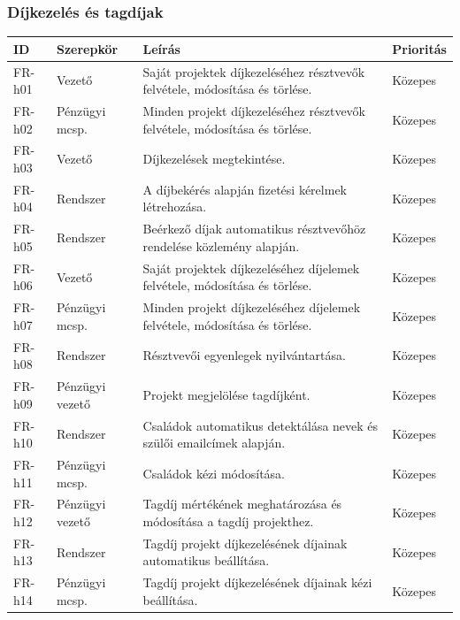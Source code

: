 \documentclass[a4paper,12pt]{article}
\begin{document}
\subsubsection{Díjkezelés és tagdíjak}
\begin{table}[H]
  \centering
  \begin{tabular}{llL{8.5cm}l}
  \toprule
  ID & Szerepkör & Leírás & Prioritás \\
  \midrule
  FR-h01 & Vezető           & Saját projektek díjkezeléséhez résztvevők felvétele, módosítása és törlése.               & Közepes\\
  FR-h02 & Pénzügyi mcsp.   & Minden projekt díjkezeléséhez résztvevők felvétele, módosítása és törlése.                & Közepes\\
  FR-h03 & Vezető           & Díjkezelések megtekintése.                                                                & Közepes\\
  FR-h04 & Rendszer         & A díjbekérés alapján fizetési kérelmek létrehozása.                                       & Közepes\\
  FR-h05 & Rendszer         & Beérkező díjak automatikus résztvevőhöz rendelése közlemény alapján.                      & Közepes\\
  FR-h06 & Vezető           & Saját projektek díjkezeléséhez díjelemek felvétele, módosítása és törlése.                & Közepes\\
  FR-h07 & Pénzügyi mcsp.   & Minden projekt díjkezeléséhez díjelemek felvétele, módosítása és törlése.                 & Közepes\\
  FR-h08 & Rendszer         & Résztvevői egyenlegek nyilvántartása.                                                     & Közepes\\
  FR-h09 & Pénzügyi vezető  & Projekt megjelölése tagdíjként.                                                           & Közepes\\
  FR-h10 & Rendszer         & Családok automatikus detektálása nevek és szülői emailcímek alapján.                      & Közepes\\
  FR-h11 & Pénzügyi mcsp.   & Családok kézi módosítása.                                                                 & Közepes\\
  FR-h12 & Pénzügyi vezető  & Tagdíj mértékének meghatározása és módosítása a tagdíj projekthez.                        & Közepes\\
  FR-h13 & Rendszer         & Tagdíj projekt díjkezelésének díjainak automatikus beállítása.                            & Közepes\\
  FR-h14 & Pénzügyi mcsp.   & Tagdíj projekt díjkezelésének díjainak kézi beállítása.                                   & Közepes\\
  \bottomrule
  \end{tabular}
\end{table}
\end{document}
